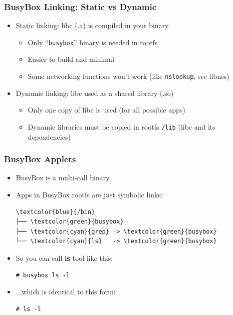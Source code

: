 \documentclass[aspectratio=169]{beamer}
\begin{document}
\begin{frame}
  \frametitle{BusyBox Linking: Static vs Dynamic}
  \begin{itemize}
    \item \alert{Static linking}: libc (.a) is compiled in your binary
      \begin{itemize}
        \item Only ``\texttt{busybox}'' binary is needed in rootfs
        \item Easier to build and minimal
        \item Some networking functions won’t work (like \texttt{nslookup},
              see libnss)
      \end{itemize}
    \bigskip
    \item \alert{Dynamic linking}: libc used as a shared library (.so)
      \begin{itemize}
        \item Only one copy of libc is used (for all possible apps)
        \item Dynamic libraries must be copied in rootfs \texttt{/lib}
              (libc and its dependencies)
      \end{itemize}
  \end{itemize}
\end{frame}

\begin{frame}[fragile]
  \frametitle{BusyBox Applets}
  \begin{itemize}
  \item BusyBox is a multi-call binary
  \item Apps in BusyBox rootfs are just symbolic links:
    \begin{Verbatim}[commandchars=\\\{\}]
\textcolor{blue}{/bin}
├── \textcolor{green}{busybox}
├── \textcolor{cyan}{grep} -> \textcolor{green}{busybox}
└── \textcolor{cyan}{ls}   -> \textcolor{green}{busybox}
    \end{Verbatim}
  \item So you can call \textbf{ls} tool like this:
    \begin{Verbatim}
# busybox ls -l
    \end{Verbatim}
  \item ...which is identical to this form:
    \begin{Verbatim}
# ls -l
    \end{Verbatim}
  \end{itemize}
\end{frame}
\end{document}
